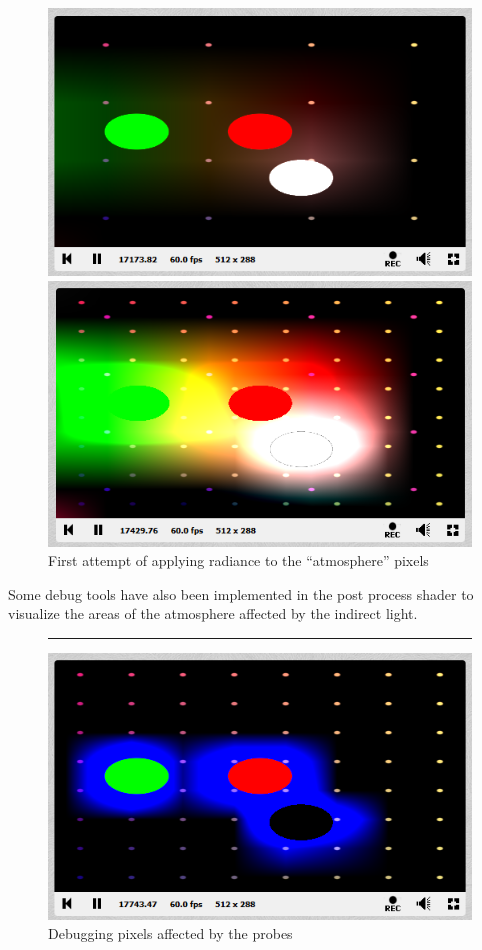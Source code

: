 \documentclass{rapportCS}
\begin{document}
\begin{figure}[!htb]
   \begin{minipage}{0.48\textwidth}
     \centering
     \includegraphics[width=.7\linewidth]{figures/shadertoy/shadertoy_no_shadows.png}
   \end{minipage}\hfill
   \begin{minipage}{0.48\textwidth}
     \centering
     \includegraphics[width=.7\linewidth]{figures/shadertoy/shadertoy_no_shadows2.png}
   \end{minipage}
    \caption{First attempt of applying radiance to the “atmosphere” pixels}
\end{figure}

Some debug tools have also been implemented in the post process shader to visualize the areas of the atmosphere affected by the indirect light.

\begin{figure}
\centering
\rule{1cm}{1cm}
\includegraphics{figures/shadertoy/shadertoy_affection.png}
\caption{Debugging pixels affected by the probes}
\end{figure}
\end{document}
